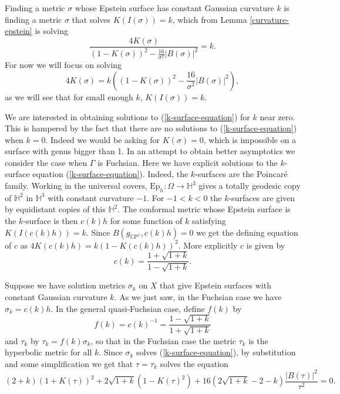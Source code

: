 \documentclass{amsart}
\newcommand{\CP}{\mathbb{C}\mathrm{P}}
\renewcommand{\H}{\mathbb{H}}
\begin{document}
Finding a metric $\sigma$ whose Epstein surface has constant Gaussian curvature $k$ is finding a metric $\sigma$ that solves $K(I(\sigma)) = k$, which from Lemma \ref{curvature-epstein} is solving
\[
\frac{4K(\sigma)}{(1-K(\sigma))^2 - \frac{16}{\sigma^2} |B(\sigma)|^2} = k.
\]
For now we will focus on solving
\begin{equation}
\label{k-surface-equation}
4K(\sigma) = k \left((1-K(\sigma))^2 - \frac{16}{\sigma^2} |B(\sigma)|^2 \right),
\end{equation}
as we will see that for small enough $k$, $K(I(\sigma)) = k$.

We are interested in obtaining solutions to (\ref{k-surface-equation}) for $k$ near zero. 
This is hampered by the fact that there are no solutions to (\ref{k-surface-equation}) when $k = 0$. 
Indeed we would be asking for $K(\sigma)=0$, which is impossible on a surface with genus bigger than 1. 
In an attempt to obtain better asymptotics we consider the case when $\Gamma$ is Fuchsian. 
Here we have explicit solutions to the $k$-surface equation (\ref{k-surface-equation}).
Indeed, the $k$-surfaces are the Poincar\'e family. 
Working in the universal covers, $\mathrm{Ep}_h : \Omega \to \H^3$ gives a totally geodesic copy of $\H^2$ in $\H^3$ with constant curvature $-1$. 
For $-1<k<0$  the $k$-surfaces are given by equidistant copies of this $\H^2$. 
The conformal metric whose Epstein surface is the $k$-surface is then $c(k)h$ for some function of $k$ satisfying $K(I(c(k)h)) = k$. 
Since $B(g_{\CP^1},c(k)h) = 0$ we get the defining equation of $c$ as $4K(c(k)h) = k(1 - K(c(k)h))^2$.
More explicitly $c$ is given by
\[
c(k) = \frac{1+\sqrt{1+k}}{1-\sqrt{1+k}}.
\]


Suppose we have solution metrics $\sigma_k$  on $X$ that give Epstein surfaces with constant Gaussian curvature $k$. 
As we just saw, in the Fuchsian case we have $\sigma_k = c(k) h$.  
In the general quasi-Fuchsian case, define $f(k)$ by 
\[
f(k) = c(k)^{-1} = \frac{1-\sqrt{1+k}}{1+\sqrt{1+k}}
\] 
and $\tau_k$ by $\tau_k = f(k)\sigma_k$, so that in the Fuchsian case the metric $\tau_k$ is the hyperbolic metric for all $k$. 
Since $\sigma_k$ solves (\ref{k-surface-equation}), by substitution and some simplification we get that $\tau = \tau_k$ solves the equation 
\begin{equation}
\label{scaled-equation}
(2+k)(1+K(\tau))^2 + 2\sqrt{1+k}\left(1-K(\tau)^2\right) + 16\left(2\sqrt{1+k} - 2 - k  \right)\frac{|B(\tau)|^2}{\tau^2} = 0.
\end{equation}
\end{document}
